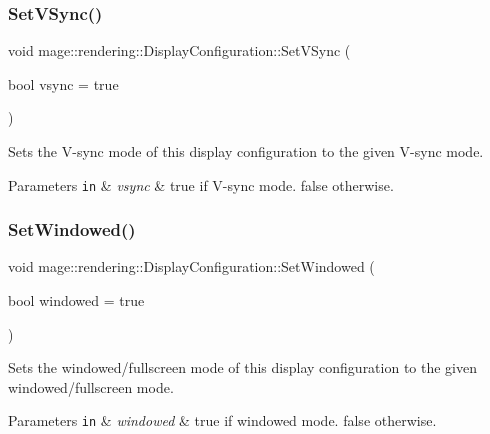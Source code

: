 \subsubsection{\texorpdfstring{Set\+V\+Sync()}{SetVSync()}}
{\footnotesize\ttfamily void mage\+::rendering\+::\+Display\+Configuration\+::\+Set\+V\+Sync (\begin{DoxyParamCaption}\item[{bool}]{vsync = {\ttfamily true} }\end{DoxyParamCaption})\hspace{0.3cm}{\ttfamily [noexcept]}}

Sets the V-\/sync mode of this display configuration to the given V-\/sync mode.


\begin{DoxyParams}[1]{Parameters}
\mbox{\tt in}  & {\em vsync} & {\ttfamily true} if V-\/sync mode. {\ttfamily false} otherwise. \\
\hline
\end{DoxyParams}
\hypertarget{classmage_1_1rendering_1_1_display_configuration_a78d0902979bd5a0eff7fef0aa7976a7f}{}\label{classmage_1_1rendering_1_1_display_configuration_a78d0902979bd5a0eff7fef0aa7976a7f} 
\subsubsection{\texorpdfstring{Set\+Windowed()}{SetWindowed()}}
{\footnotesize\ttfamily void mage\+::rendering\+::\+Display\+Configuration\+::\+Set\+Windowed (\begin{DoxyParamCaption}\item[{bool}]{windowed = {\ttfamily true} }\end{DoxyParamCaption})\hspace{0.3cm}{\ttfamily [noexcept]}}

Sets the windowed/fullscreen mode of this display configuration to the given windowed/fullscreen mode.


\begin{DoxyParams}[1]{Parameters}
\mbox{\tt in}  & {\em windowed} & {\ttfamily true} if windowed mode. {\ttfamily false} otherwise. \\
\hline
\end{DoxyParams}
\hypertarget{classmage_1_1rendering_1_1_display_configuration_abbcb68e66c4a659cb169819a4f1d0d5d}{}\label{classmage_1_1rendering_1_1_display_configuration_abbcb68e66c4a659cb169819a4f1d0d5d} 
